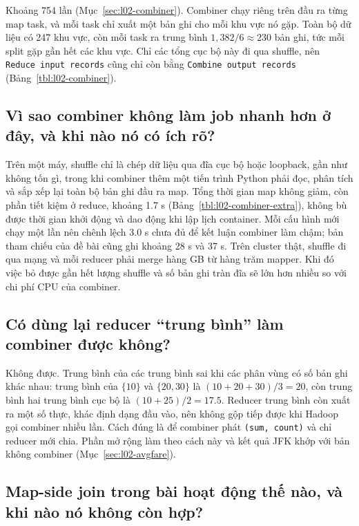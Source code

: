 \documentclass[
  12pt,
  a4paper,
]{report}
\begin{document}
Khoảng 754 lần (Mục~\ref{sec:l02-combiner}). Combiner chạy riêng trên
đầu ra từng map task, và mỗi task chỉ xuất một bản ghi cho mỗi khu vực
nó gặp. Toàn bộ dữ liệu có 247 khu vực, còn mỗi task ra trung bình
\(1{,}382 / 6 \approx 230\) bản ghi, tức mỗi split gặp gần hết các khu
vực. Chỉ các tổng cục bộ này đi qua shuffle, nên
\texttt{Reduce\ input\ records}\allowbreak{} cũng chỉ còn bằng
\texttt{Combine\ output\ records}\allowbreak{}
(Bảng~\ref{tbl:l02-combiner}).

\subsection{Vì sao combiner không làm job nhanh hơn ở đây, và khi nào nó
có ích rõ?}\label{sec:l02-q5}

Trên một máy, shuffle chỉ là chép dữ liệu qua đĩa cục bộ hoặc loopback,
gần như không tốn gì, trong khi combiner thêm một tiến trình Python phải
đọc, phân tích và sắp xếp lại toàn bộ bản ghi đầu ra map. Tổng thời gian
map không giảm, còn phần tiết kiệm ở reduce, khoảng 1.7 s
(Bảng~\ref{tbl:l02-combiner-extra}), không bù được thời gian khởi động
và dao động khi lập lịch container. Mỗi cấu hình mới chạy một lần nên
chênh lệch 3.0 s chưa đủ để kết luận combiner làm chậm; bản tham chiếu
của đề bài cũng ghi khoảng 28 s và 37 s. Trên cluster thật, shuffle đi
qua mạng và mỗi reducer phải merge hàng GB từ hàng trăm mapper. Khi đó
việc bỏ được gần hết lượng shuffle và số bản ghi tràn đĩa sẽ lớn hơn
nhiều so với chi phí CPU của combiner.

\subsection{Có dùng lại reducer ``trung bình'' làm combiner được
không?}\label{sec:l02-q6}

Không được. Trung bình của các trung bình sai khi các phân vùng có số
bản ghi khác nhau: trung bình của \(\{10\}\) và \(\{20, 30\}\) là
\((10+20+30)/3 = 20\), còn trung bình hai trung bình cục bộ là
\((10 + 25)/2 = 17.5\). Reducer trung bình còn xuất ra một số thực, khác
định dạng đầu vào, nên không gộp tiếp được khi Hadoop gọi combiner nhiều
lần. Cách đúng là để combiner phát \texttt{(sum,\ count)} và chỉ reducer
mới chia. Phần mở rộng làm theo cách này và kết quả JFK khớp với bản
không combiner (Mục~\ref{sec:l02-avgfare}).

\subsection{Map-side join trong bài hoạt động thế nào, và khi nào nó
không còn hợp?}\label{sec:l02-q7}
\end{document}
